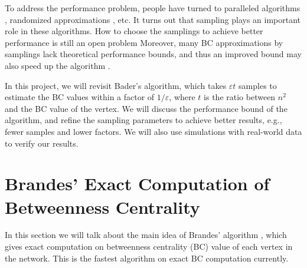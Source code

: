 \documentclass[10pt]{article}
\begin{document}
To address the performance problem, people have turned to paralleled algorithms \cite{madduri2009faster, bader2008graph, riondato2014fast}, randomized approximations \cite{bader2007approximating, geisberger2008better}, etc. It turns out that sampling plays an important role in these algorithms. How to choose the samplings to achieve better performance is still an open problem \cite{bader2007approximating} Moreover, many BC approximations by samplings lack theoretical performance bounds, and thus an improved bound may also speed up the algorithm \cite{geisberger2008better}. 

In this project, we will revisit Bader's algorithm, which takes $\varepsilon t$ samples to estimate the BC values within a factor of $1/\varepsilon$, where $t$ is the ratio between $n^2$ and the BC value of the vertex. We will discuss the performance bound of the algorithm, and refine the sampling parameters to achieve better results, e.g., fewer samples and lower factors. We will also use simulations with real-world data to verify our results.

\section{Brandes' Exact Computation of Betweenness Centrality}
In this section we will talk about the main idea of Brandes' algorithm \cite{brandes2001faster}, which gives exact computation on betweenness centrality (BC) value of each vertex in the network. This is the fastest algorithm on exact BC computation currently.
\end{document}
